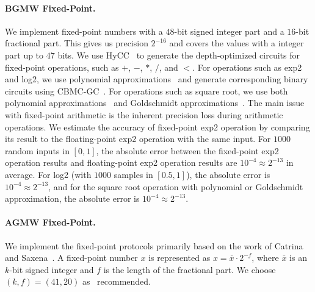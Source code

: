 \paragraph{BGMW Fixed-Point.}
We implement fixed-point numbers with a $48$-bit signed integer part and a $16$-bit fractional part.
This gives us precision $2^{-16}$ and covers the values with a integer part up to $47$ bits.
We use HyCC~\cite{buscher2018hycc} to generate the depth-optimized circuits for fixed-point operations, such as $+$, $-$, $*$, $/$, and $<$.
For operations such as exp2 and log2, we use polynomial approximations~\cite{hart1978computer,aly2019benchmarking} and generate corresponding binary circuits using CBMC-GC~\cite{buscher2016compiling}.
For operations such as square root, we use both polynomial approximations~\cite{hart1978computer} and Goldschmidt approximations~\cite{markstein2004software,aly2019benchmarking}.
The main issue with fixed-point arithmetic is the inherent precision loss during arithmetic operations.
We estimate the accuracy of fixed-point exp2 operation by comparing its result to the floating-point exp2 operation with the same input.
For $1000$ random inputs in $\left[0,1\right]$, the absolute error between the fixed-point exp2 operation results and floating-point exp2 operation results are $10^{-4}\approx 2^{-13}$ in average.
For log2 (with $1000$ samples in $\left[0.5,1\right] $), the absolute error is $10^{-4}\approx 2^{-13}$, and for the square root operation with polynomial or Goldschmidt approximation, the absolute error is $10^{-4}\approx 2^{-13}$.

\paragraph{AGMW Fixed-Point.}
\label{para:AGMWFixed-Point}
We implement the \arithmeticGMW fixed-point protocols primarily based on the work of Catrina and Saxena~\cite{catrina2010secure}. A fixed-point number $x$ is represented as $x = \overline{x}\cdot  2^{-f}$, where $\overline{x}$ is an $k$-bit signed integer and $f$ is the length of the fractional part.
We choose $\left(k,f\right)=\left(41,20\right)  $ as~\cite{aly2021scale} recommended.

